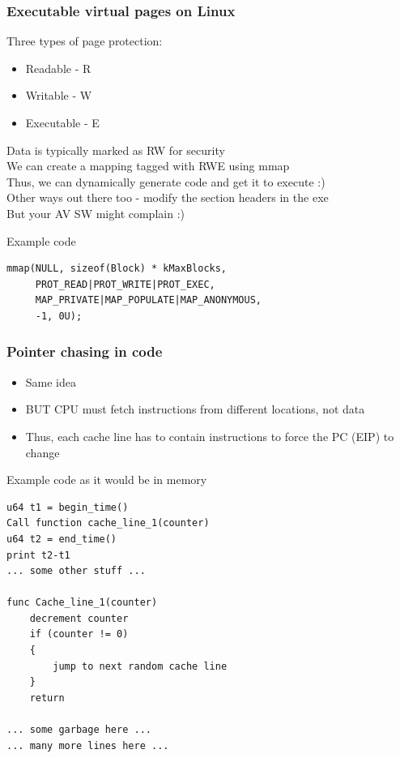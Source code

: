 \documentclass{beamer}
\begin{document}
\begin{frame}[fragile]
\frametitle{Executable virtual pages on Linux}
Three types of page protection:\\
\begin{itemize}
\item Readable - R
\item Writable - W
\item Executable - E
\end{itemize}
Data is typically marked as RW for security\\
We can create a mapping tagged with RWE using mmap\\
Thus, we can dynamically generate code and get it to execute :)\\
Other ways out there too - modify the section headers in the exe\\
But your AV SW might complain :)

\begin{block}{Example code}
\begin{lstlisting}[style=code]
mmap(NULL, sizeof(Block) * kMaxBlocks,
     PROT_READ|PROT_WRITE|PROT_EXEC,
     MAP_PRIVATE|MAP_POPULATE|MAP_ANONYMOUS,
     -1, 0U);
\end{lstlisting}
\end{block}
\end{frame}

\begin{frame}[fragile]
\frametitle{Pointer chasing in code}
\begin{itemize}
\item Same idea
\item BUT CPU must fetch instructions from different locations, not data
\item Thus, each cache line has to contain instructions to force the PC (EIP) to change
\end{itemize}
\begin{block}{Example code as it would be in memory}
\begin{lstlisting}[style=code]
u64 t1 = begin_time()
Call function cache_line_1(counter)
u64 t2 = end_time()
print t2-t1
... some other stuff ...

func Cache_line_1(counter)
    decrement counter
    if (counter != 0)
    {
        jump to next random cache line
    }
    return

... some garbage here ...
... many more lines here ...
\end{lstlisting}
\end{block}
\end{frame}
\end{document}
